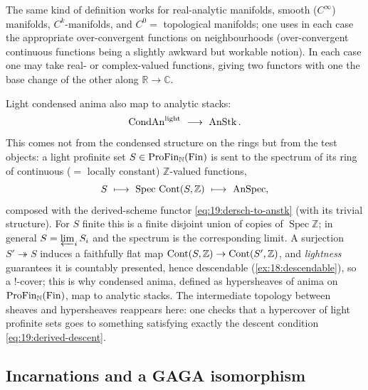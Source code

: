 \begin{remark}
\label{rmk:19:manifold-flavours}
The same kind of definition works for real-analytic manifolds, smooth ($C^\infty$)
manifolds, $C^k$-manifolds, and $C^0=$ topological manifolds; one uses in each
case the appropriate over-convergent functions on neighbourhoods (over-convergent
continuous functions being a slightly awkward but workable notion). In each case
one may take real- or complex-valued functions, giving two functors with one the
base change of the other along $\mathbb R\to\mathbb C$.
\end{remark}

\begin{example}
\label{ex:19:condensed-anima}
Light condensed anima also map to analytic stacks:
\begin{equation*}
\operatorname{CondAn}^{\mathrm{light}}\ \longrightarrow\ \AnStk .
\end{equation*}
This comes not from the condensed structure on the rings but from the test
objects: a light profinite set $S\in\mathrm{ProFin}_{\mathbb N}(\mathrm{Fin})$ is sent to
the spectrum of its ring of continuous ($=$ locally constant) $\mathbb Z$-valued
functions,
\begin{equation*}
S\ \longmapsto\ \operatorname{Spec}\,\Cont(S,\mathbb Z)\ \longmapsto\ \AnSpec ,
\end{equation*}
composed with the derived-scheme functor \eqref{eq:19:dersch-to-anstk} (with its
trivial structure). For $S$ finite this is a finite disjoint union of copies of
$\operatorname{Spec}\mathbb Z$; in general $S=\varprojlim_i S_i$ and the spectrum
is the corresponding limit. A surjection $S'\twoheadrightarrow S$ induces a
faithfully flat map $\operatorname{Cont}(S,\mathbb Z)\to\operatorname{Cont}(S',\mathbb Z)$, and
\emph{lightness} guarantees it is countably presented, hence descendable
(\cref{ex:18:descendable}), so a $!$-cover; this is why condensed anima, defined
as hypersheaves of anima on $\mathrm{ProFin}_{\mathbb N}(\mathrm{Fin})$, map to analytic
stacks. The intermediate topology between sheaves and hypersheaves reappears here:
one checks that a hypercover of light profinite sets goes to something satisfying
exactly the descent condition \eqref{eq:19:derived-descent}.
\end{example}

\subsection{Incarnations and a GAGA isomorphism}
\label{subsec:19:incarnations}

